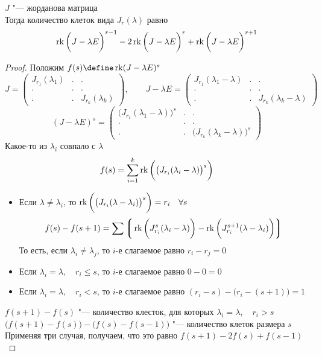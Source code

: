 \begin{theorem}
	$ J $ "--- жорданова матрица \\
	Тогда количество клеток вида $ J_r(\lambda) $ равно
	$$ \operatorname{rk} \bigg( J - \lambda E \bigg)^{r - 1} - 2 \operatorname{rk} \bigg( J - \lambda E \bigg)^r + \operatorname{rk} \bigg( J - \lambda E \bigg)^{r + 1} $$
\end{theorem}

\begin{proof}
	Положим $ f(s) \define \rk (J - \lambda E)^s $
	$$ J =
	\begin{pmatrix}
		J_{r_1}(\lambda_1) & . & . \\
		. & . & . \\
		. & . & J_{r_k}(\lambda_k)
	\end{pmatrix}, \qquad J - \lambda E =
	\begin{pmatrix}
		J_{r_1}(\lambda_1 - \lambda) & . & . \\
		. & . & . \\
		. & . & J_{r_k}(\lambda_k - \lambda)
	\end{pmatrix} $$
	$$ (J - \lambda E)^s =
	\begin{pmatrix}
		\bigg( J_{r_1}(\lambda_1 - \lambda) \bigg)^s & . & . \\
		. & . & . \\
		. & . & \bigg( J_{r_k}(\lambda_k - \lambda) \bigg)^s
	\end{pmatrix} $$
	Какое-то из $ \lambda_i $ совпало с $ \lambda $
	$$ f(s) = \sum_{i = 1}^k \operatorname{rk} \bigg( \big( J_{r_i}(\lambda_i - \lambda) \big)^s \bigg) $$
	\begin{itemize}
		\item Если $ \lambda \ne \lambda_i $, то $ \operatorname{rk} \bigg( \big( J_{r_i}(\lambda - \lambda_i) \big)^s \bigg) = r_i \quad \forall s $
		$$ f(s) - f(s + 1) = \sum \bigg\lgroup \operatorname{rk} \bigg( J_{r_i}^s(\lambda_i - \lambda) \bigg) - \operatorname{rk} \bigg( J_{r_i}^{s + 1}(\lambda - \lambda_i) \bigg) \bigg\rgroup $$
		То есть, если $ \lambda_i \ne \lambda_j $, то $ i $-е слагаемое равно $ r_i - r_j = 0 $
		\item Если $ \lambda_i = \lambda, \quad r_i \le s $, то $ i $-е слагаемое равно $ 0 - 0 = 0 $
		\item Если $ \lambda_i = \lambda, \quad r_i < s $, то $ i $-е слагаемое равно $ (r_i - s) - \bigg( r_i - (s + 1) \bigg) = 1 $
	\end{itemize}
	$ f(s + 1) - f(s) $ "--- количество клесток, для которых $ \lambda_i = \lambda, \quad r_i > s $ \\
	$ \bigg( f(s + 1) - f(s) \bigg) - \bigg( f(s) - f(s - 1) \bigg) $ "--- количество клеток размера $ s $ \\
	Применяя три случая, получаем, что это равно $ f(s + 1) - 2f(s) + f(s - 1) $
\end{proof}

